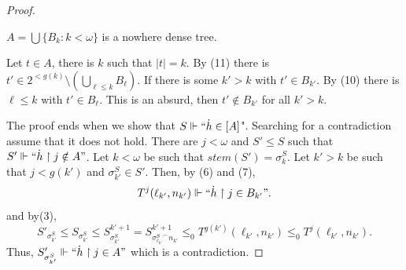 \documentclass[10pt,a4paper]{amsart}
\begin{document}
\begin{proof}
\begin{claim}
$A=\bigcup\{B_k:k<\omega\}$ is a nowhere dense tree.
\end{claim}
\begin{proofclaim}
    Let $t\in A$, there is $k$ such that $|t|=k$. By (11) there is $t'\in 2^{<g(k)}\setminus (\bigcup_{\ell\leq k}B_{\ell})$. If there is some $k'>k$ with $t'\in B_{k'}$. By (10) there is $\ell\leq k$ with $t'\in B_\ell$. This is an absurd, then $t'\notin B_{k'}$ for all $k'>k$.
\end{proofclaim}

The proof ends when we show that $S\Vdash``\dot h \in [A]$". Searching for a contradiction assume that it does not hold. There are $j<\omega$ and $S'\leq S$ such that $S'\Vdash``\dot h\upharpoonright j\notin A"$. Let $k<\omega$ be such that $stem(S')=\sigma^{S}_k$. Let $k'>k$ be  such that $j<g(k')$ and $\sigma^S_{k'}\in S'$. Then, by (6) and (7),
\begin{displaymath}
    T^j(\ell_{k'}, n_{k'})\Vdash ``\dot h\upharpoonright j\in B_{k'}".
\end{displaymath}
and by(3), 
\[
S'_{\sigma^S_{k'}}\leq S_{\sigma^S_{k'}}\leq S^{k'+1}_{\sigma^S_{k'}}=S^{k'+1}_{{\sigma^S_{\ell_{k'}}}^\frown n_{k'}}\leq_0 T^{g(k')}(\ell_{k'},n_{k'})\leq_0  T^j(\ell_{k'}, n_{k'}).
\]
Thus, $S'_{\sigma^S_{k'}}\Vdash`` \dot h\upharpoonright j\in A"$ which is a contradiction.
\end{proof}
\end{document}
